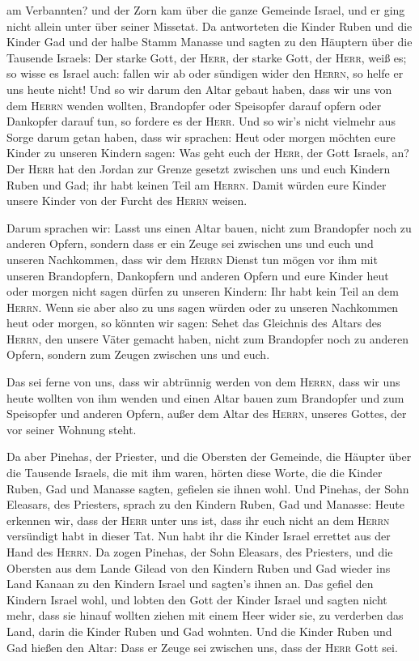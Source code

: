 am Verbannten? und der Zorn kam über die ganze Gemeinde Israel, und er
ging nicht allein unter über seiner Missetat.  Da
antworteten die Kinder Ruben und die Kinder Gad und der halbe Stamm
Manasse und sagten zu den Häuptern über die Tausende Israels:
 Der starke Gott, der \textsc{Herr}, der starke Gott, der
\textsc{Herr}, weiß es; so wisse es Israel auch: fallen wir ab oder
sündigen wider den \textsc{Herrn}, so helfe er uns heute nicht!
 Und so wir darum den Altar gebaut haben, dass wir uns
von dem \textsc{Herrn} wenden wollten, Brandopfer oder Speisopfer darauf
opfern oder Dankopfer darauf tun, so fordere es der \textsc{Herr}.
 Und so wir's nicht vielmehr aus Sorge darum getan haben,
dass wir sprachen: Heut oder morgen möchten eure Kinder zu unseren
Kindern sagen: Was geht euch der \textsc{Herr}, der Gott Israels, an?
 Der \textsc{Herr} hat den Jordan zur Grenze gesetzt
zwischen uns und euch Kindern Ruben und Gad; ihr habt keinen Teil am
\textsc{Herrn}. Damit würden eure Kinder unsere Kinder von der Furcht
des \textsc{Herrn} weisen.

 Darum sprachen wir: Lasst uns einen Altar bauen, nicht
zum Brandopfer noch zu anderen Opfern,  sondern dass er
ein Zeuge sei zwischen uns und euch und unseren Nachkommen, dass wir dem
\textsc{Herrn} Dienst tun mögen vor ihm mit unseren Brandopfern,
Dankopfern und anderen Opfern und eure Kinder heut oder morgen nicht
sagen dürfen zu unseren Kindern: Ihr habt kein Teil an dem
\textsc{Herrn}.  Wenn sie aber also zu uns sagen würden
oder zu unseren Nachkommen heut oder morgen, so könnten wir sagen: Sehet
das Gleichnis des Altars des \textsc{Herrn}, den unsere Väter gemacht
haben, nicht zum Brandopfer noch zu anderen Opfern, sondern zum Zeugen
zwischen uns und euch.

 Das sei ferne von uns, dass wir abtrünnig werden von dem
\textsc{Herrn}, dass wir uns heute wollten von ihm wenden und einen
Altar bauen zum Brandopfer und zum Speisopfer und anderen Opfern, außer
dem Altar des \textsc{Herrn}, unseres Gottes, der vor seiner Wohnung
steht.

 Da aber Pinehas, der Priester, und die Obersten der
Gemeinde, die Häupter über die Tausende Israels, die mit ihm waren,
hörten diese Worte, die die Kinder Ruben, Gad und Manasse sagten,
gefielen sie ihnen wohl.  Und Pinehas, der Sohn Eleasars,
des Priesters, sprach zu den Kindern Ruben, Gad und Manasse: Heute
erkennen wir, dass der \textsc{Herr} unter uns ist, dass ihr euch nicht
an dem \textsc{Herrn} versündigt habt in dieser Tat. Nun habt ihr die
Kinder Israel errettet aus der Hand des \textsc{Herrn}. 
Da zogen Pinehas, der Sohn Eleasars, des Priesters, und die Obersten aus
dem Lande Gilead von den Kindern Ruben und Gad wieder ins Land Kanaan zu
den Kindern Israel und sagten's ihnen an.  Das gefiel den
Kindern Israel wohl, und lobten den Gott der Kinder Israel und sagten
nicht mehr, dass sie hinauf wollten ziehen mit einem Heer wider sie, zu
verderben das Land, darin die Kinder Ruben und Gad wohnten.
 Und die Kinder Ruben und Gad hießen den Altar: Dass er
Zeuge sei zwischen uns, dass der \textsc{Herr} Gott sei.

